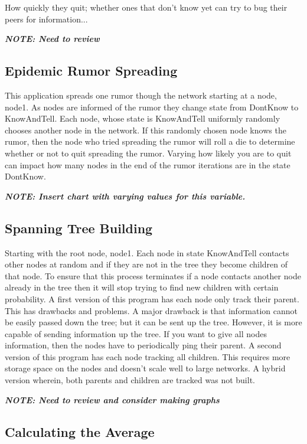 \documentclass[11pt,twocolumn]{article}
\begin{document}
How quickly they quit; whether ones that don't know yet can try to bug their peers for information...

{\bf {\em NOTE: Need to review}}

\subsection{Epidemic Rumor Spreading}

This application spreads one rumor though the network starting at a node, node1.  As nodes are informed of the rumor they change state from DontKnow to KnowAndTell.  Each node, whose state is KnowAndTell uniformly randomly chooses another node in the network.  If this randomly chosen node knows the rumor, then the node who tried spreading the rumor will roll a die to determine whether or not to quit spreading the rumor.  Varying how likely you are to quit can impact how many nodes in the end of the rumor iterations are in the state DontKnow.

{\bf {\em NOTE: Insert chart with varying values for this variable.}}

\subsection{Spanning Tree Building}

Starting with the root node, node1.  Each node in state KnowAndTell contacts other nodes at random and if they are not in the tree they become children of that node.  To ensure that this process terminates if a node contacts another node already in the tree then it will stop trying to find new children with certain probability.  A first version of this program has each node only track their parent.  This has drawbacks and problems.  A major drawback is that information cannot be easily passed down the tree; but it can be sent up the tree.  However, it is more capable of sending information up the tree.  If you want to give all nodes information, then the nodes have to periodically ping their parent.  A second version of this program has each node tracking all children.  This requires more storage space on the nodes and doesn't scale well to large networks.  A hybrid version wherein, both parents and children are tracked was not built.

{\bf {\em NOTE: Need to review and consider making graphs}}

\subsection{Calculating the Average}
\end{document}
